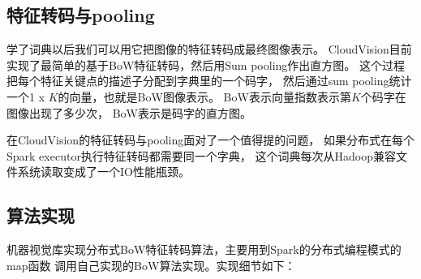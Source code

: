 \subsection{特征转码与pooling}
\label{subsec:feature-encoding}
学了词典以后我们可以用它把图像的特征转码成最终图像表示。
CloudVision目前实现了最简单的基于BoW特征转码，然后用Sum pooling作出直方图。
这个过程把每个特征关键点的描述子分配到字典里的一个码字，
然后通过sum pooling统计一个1 x $K$的向量，也就是BoW图像表示。
BoW表示向量指数表示第$K$个码字在图像出现了多少次，
BoW表示是码字的直方图。

在CloudVision的特征转码与pooling面对了一个值得提的问题，
如果分布式在每个Spark executor执行特征转码都需要同一个字典，
这个词典每次从Hadoop兼容文件系统读取变成了一个IO性能瓶颈。

\subsection*{算法实现}
机器视觉库实现分布式BoW特征转码算法，主要用到Spark的分布式编程模式的map函数
调用自己实现的BoW算法实现。实现细节如下：
